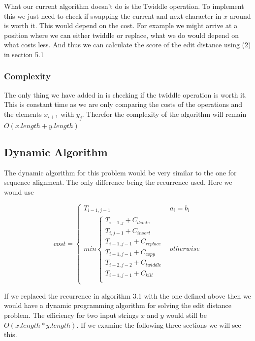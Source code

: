 \documentclass{article}
\begin{document}
					What our current algorithm doesn't do is the Twiddle operation. To implement this we just need to check if swapping the current and next character in $x$ around is worth it. This would depend on the cost. For example we might arrive at a position where we can either twiddle or replace, what we do would depend on what costs less. And thus we can calculate the score of the edit distance using (2) in section 5.1
					
					\subsubsection{Complexity}
						The only thing we have added in is checking if the twiddle operation is worth it. This is constant time as we are only comparing the costs of the operations and the elements $x_{i+1}$ with $y_j$. Therefor the complexity of the algorithm will remain $O(x.length + y.length)$
				
				\subsection{Dynamic Algorithm}							
					The dynamic algorithm for this problem would be very similar to the one for sequence alignment. The only difference being the recurrence used. Here we would use
					
					\[cost =	\begin{cases}
						
						T_{i-1,j-1} & a_i = b_i\\
						
						min\begin{cases}
							T_{i-1, j} + C_{delete}\\
							T_{i, j-1} + C_{insert}\\
							T_{i-1, j-1} + C_{replace}\\
							T_{i-1, j-1} + C_{copy}\\
							T_{i-2, j-2} + C_{twiddle}\\
							T_{i-1, j-1} + C_{kill}\\
						\end{cases} & otherwise
						
						\end{cases}
					\]
					
					If we replaced the recurrence in algorithm 3.1 with the one defined above then we would have a dynamic programming algorithm for solving the edit distance problem. The efficiency for two input strings $x$ and $y$ would still be $O(x.length*y.length)$. If we examine the following three sections we will see this.
					
\end{document}
